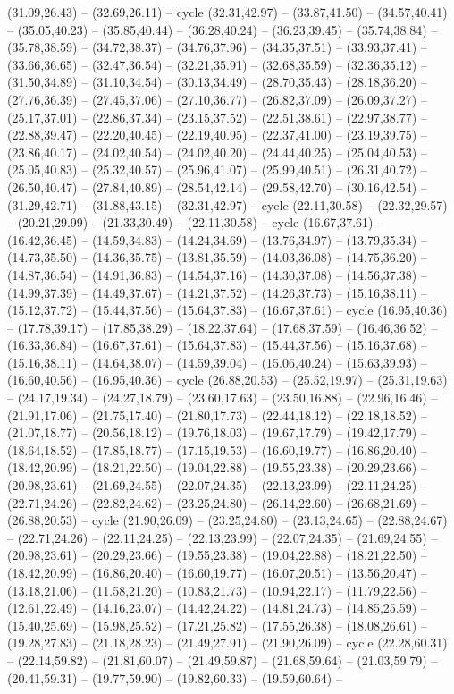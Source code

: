 {(31.09,26.43) -- (32.69,26.11) -- cycle (32.31,42.97) -- (33.87,41.50) -- (34.57,40.41) -- (35.05,40.23) -- (35.85,40.44) -- (36.28,40.24) -- (36.23,39.45) -- (35.74,38.84) -- (35.78,38.59) -- (34.72,38.37) -- (34.76,37.96) -- (34.35,37.51) -- (33.93,37.41) -- (33.66,36.65) -- (32.47,36.54) -- (32.21,35.91) -- (32.68,35.59) -- (32.36,35.12) -- (31.50,34.89) -- (31.10,34.54) -- (30.13,34.49) -- (28.70,35.43) -- (28.18,36.20) -- (27.76,36.39) -- (27.45,37.06) -- (27.10,36.77) -- (26.82,37.09) -- (26.09,37.27) -- (25.17,37.01) -- (22.86,37.34) -- (23.15,37.52) -- (22.51,38.61) -- (22.97,38.77) -- (22.88,39.47) -- (22.20,40.45) -- (22.19,40.95) -- (22.37,41.00) -- (23.19,39.75) -- (23.86,40.17) -- (24.02,40.54) -- (24.02,40.20) -- (24.44,40.25) -- (25.04,40.53) -- (25.05,40.83) -- (25.32,40.57) -- (25.96,41.07) -- (25.99,40.51) -- (26.31,40.72) -- (26.50,40.47) -- (27.84,40.89) -- (28.54,42.14) -- (29.58,42.70) -- (30.16,42.54) -- (31.29,42.71) -- (31.88,43.15) -- (32.31,42.97) -- cycle (22.11,30.58) -- (22.32,29.57) -- (20.21,29.99) -- (21.33,30.49) -- (22.11,30.58) -- cycle (16.67,37.61) -- (16.42,36.45) -- (14.59,34.83) -- (14.24,34.69) -- (13.76,34.97) -- (13.79,35.34) -- (14.73,35.50) -- (14.36,35.75) -- (13.81,35.59) -- (14.03,36.08) -- (14.75,36.20) -- (14.87,36.54) -- (14.91,36.83) -- (14.54,37.16) -- (14.30,37.08) -- (14.56,37.38) -- (14.99,37.39) -- (14.49,37.67) -- (14.21,37.52) -- (14.26,37.73) -- (15.16,38.11) -- (15.12,37.72) -- (15.44,37.56) -- (15.64,37.83) -- (16.67,37.61) -- cycle (16.95,40.36) -- (17.78,39.17) -- (17.85,38.29) -- (18.22,37.64) -- (17.68,37.59) -- (16.46,36.52) -- (16.33,36.84) -- (16.67,37.61) -- (15.64,37.83) -- (15.44,37.56) -- (15.16,37.68) -- (15.16,38.11) -- (14.64,38.07) -- (14.59,39.04) -- (15.06,40.24) -- (15.63,39.93) -- (16.60,40.56) -- (16.95,40.36) -- cycle (26.88,20.53) -- (25.52,19.97) -- (25.31,19.63) -- (24.17,19.34) -- (24.27,18.79) -- (23.60,17.63) -- (23.50,16.88) -- (22.96,16.46) -- (21.91,17.06) -- (21.75,17.40) -- (21.80,17.73) -- (22.44,18.12) -- (22.18,18.52) -- (21.07,18.77) -- (20.56,18.12) -- (19.76,18.03) -- (19.67,17.79) -- (19.42,17.79) -- (18.64,18.52) -- (17.85,18.77) -- (17.15,19.53) -- (16.60,19.77) -- (16.86,20.40) -- (18.42,20.99) -- (18.21,22.50) -- (19.04,22.88) -- (19.55,23.38) -- (20.29,23.66) -- (20.98,23.61) -- (21.69,24.55) -- (22.07,24.35) -- (22.13,23.99) -- (22.11,24.25) -- (22.71,24.26) -- (22.82,24.62) -- (23.25,24.80) -- (26.14,22.60) -- (26.68,21.69) -- (26.88,20.53) -- cycle (21.90,26.09) -- (23.25,24.80) -- (23.13,24.65) -- (22.88,24.67) -- (22.71,24.26) -- (22.11,24.25) -- (22.13,23.99) -- (22.07,24.35) -- (21.69,24.55) -- (20.98,23.61) -- (20.29,23.66) -- (19.55,23.38) -- (19.04,22.88) -- (18.21,22.50) -- (18.42,20.99) -- (16.86,20.40) -- (16.60,19.77) -- (16.07,20.51) -- (13.56,20.47) -- (13.18,21.06) -- (11.58,21.20) -- (10.83,21.73) -- (10.94,22.17) -- (11.79,22.56) -- (12.61,22.49) -- (14.16,23.07) -- (14.42,24.22) -- (14.81,24.73) -- (14.85,25.59) -- (15.40,25.69) -- (15.98,25.52) -- (17.21,25.82) -- (17.55,26.38) -- (18.08,26.61) -- (19.28,27.83) -- (21.18,28.23) -- (21.49,27.91) -- (21.90,26.09) -- cycle (22.28,60.31) -- (22.14,59.82) -- (21.81,60.07) -- (21.49,59.87) -- (21.68,59.64) -- (21.03,59.79) -- (20.41,59.31) -- (19.77,59.90) -- (19.82,60.33) -- (19.59,60.64) -- }
